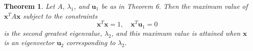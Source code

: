 \documentclass{article}
\theoremstyle{plain}
\newtheorem{thm}{Theorem}[section]
\theoremstyle{definition}
\theoremstyle{remark}
\begin{document}
\begin{thm}
    Let \(A\), \(\lambda_1\), and \(\textbf{u}_1\) be as in Theorem 6. Then the maximum value of \(\textbf{x}^TA\textbf{x}\) subject to the constraints \[\textbf{x}^T\textbf{x}=1,\quad\textbf{x}^T\textbf{u}_1=0\] is the second greatest eigenvalue, \(\lambda_2\), and this maximum value is attained when \(\textbf{x}\) is an eigenvector \(\textbf{u}_2\) corresponding to \(\lambda_2\).
\end{thm}
\end{document}
